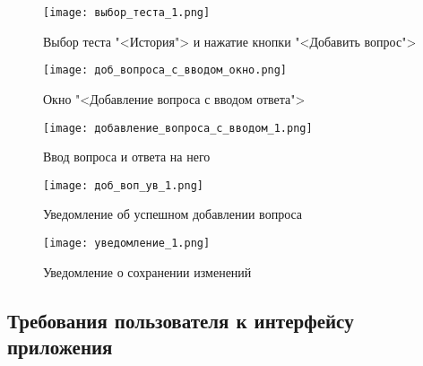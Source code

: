 \begin{figure}[H]
	\centering
	\texttt{[image: выбор\_теста\_1.png]}
	\caption{Выбор теста "<История"> и нажатие кнопки "<Добавить вопрос">}
	\label{select_test_1:image}
\end{figure}
\begin{figure}[H]
	\centering
	\texttt{[image: доб\_вопроса\_с\_вводом\_окно.png]}
	\caption{Окно "<Добавление вопроса с вводом ответа">}
	\label{adding_baseQuestion_window:image}
\end{figure}
\begin{figure}[H]
	\centering
	\texttt{[image: добавление\_вопроса\_с\_вводом\_1.png]}
	\caption{Ввод вопроса и ответа на него}
	\label{adding_baseQuestion_1:image}
\end{figure}
\begin{figure}[ht]
	\centering
	\texttt{[image: доб\_воп\_ув\_1.png]}
	\caption{Уведомление об успешном добавлении вопроса}
	\label{adding_baseQuestion_2:image}
\end{figure}
\begin{figure}[H]
	\centering
	\texttt{[image: уведомление\_1.png]}
	\caption{Уведомление о сохранении изменений}
	\label{adding_baseQuestion_3:image}
\end{figure}

\subsection{Требования пользователя к интерфейсу приложения}


